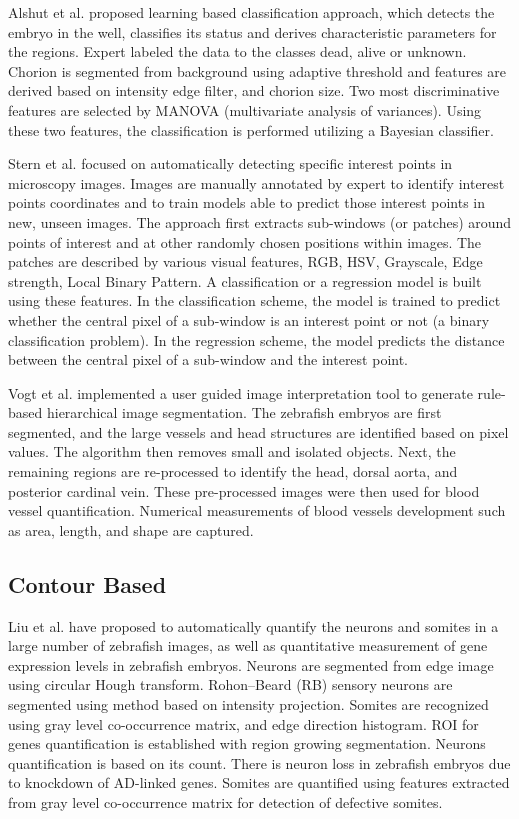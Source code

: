 Alshut et al. \cite{alshut2010} proposed learning based classification approach, which detects the embryo in the well, classifies its status and derives characteristic parameters for the regions. Expert labeled the data to the classes dead, alive or unknown. Chorion is segmented from background using adaptive threshold and features are derived based on intensity edge filter, and chorion size. Two most discriminative features are selected by MANOVA (multivariate analysis of variances). Using these two features, the classification is performed utilizing a Bayesian classifier.

Stern et al. \cite{Stern11} focused on automatically detecting specific interest points in microscopy images. Images are manually annotated by expert to identify interest points coordinates and to train models able to predict those interest points in new, unseen images. The approach first extracts sub-windows (or patches) around points of interest and at other randomly chosen positions within images. The patches are described by various visual features, RGB, HSV, Grayscale, Edge strength, Local Binary Pattern. A classification or a regression model is built using these features. In the classification scheme, the model is trained to predict whether the central pixel of a sub-window is an interest point or not (a binary classification problem). In the regression scheme, the model predicts the distance between the central pixel of a sub-window and the interest point.

Vogt et al. \cite{Vogt09} implemented a user guided image interpretation tool to generate rule-based hierarchical image segmentation. The zebrafish embryos are first segmented, and the large vessels and head structures are identified based on pixel values. The algorithm then removes small and isolated objects. Next, the remaining regions are re-processed to identify the head, dorsal aorta, and posterior cardinal vein. These pre-processed images were then used for blood vessel quantification. Numerical measurements of blood vessels development such as area, length, and shape are captured. 

\subsection{Contour Based}

Liu et al. \cite{Liu06} have proposed to automatically quantify the neurons and somites in a large number of zebrafish images, as well as quantitative measurement of gene expression levels in zebrafish embryos. Neurons are segmented from edge image using circular Hough transform. Rohon–Beard (RB) sensory neurons are segmented using method based on intensity projection. Somites are recognized using gray level co-occurrence matrix, and edge direction histogram. ROI for genes quantification is established with region growing segmentation. Neurons quantification is based on its count. There is neuron loss in zebrafish embryos due to knockdown of AD-linked genes. Somites are quantified using features extracted from gray level co-occurrence matrix for detection of defective somites.

